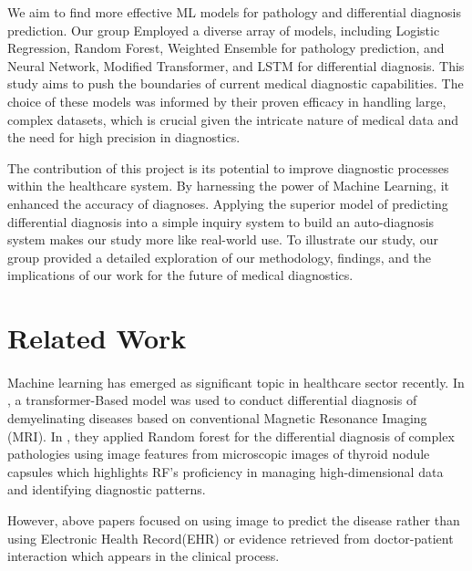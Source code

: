 \documentclass{article}
\begin{document}
We aim to find more effective ML models for pathology and differential diagnosis prediction. Our group Employed a diverse array of models, including Logistic Regression, Random Forest, Weighted Ensemble for pathology prediction, and Neural Network, Modified Transformer, and LSTM for differential diagnosis. This study aims to push the boundaries of current medical diagnostic capabilities. The choice of these models was informed by their proven efficacy in handling large, complex datasets, which is crucial given the intricate nature of medical data and the need for high precision in diagnostics.

The contribution of this project is its potential to improve diagnostic processes within the healthcare system. By harnessing the power of Machine Learning, it enhanced the accuracy of diagnoses. Applying the superior model of predicting differential diagnosis into a simple inquiry system to build an auto-diagnosis system makes our study more like real-world use. To illustrate our study, our group provided a detailed exploration of our methodology, findings, and the implications of our work for the future of medical diagnostics.


\section{Related Work}
\paragraph{ }
Machine learning has emerged as significant topic in healthcare sector recently. In \parencite{Huang_2022}, a transformer-Based model was used to conduct differential diagnosis of demyelinating diseases based on conventional Magnetic Resonance Imaging (MRI). In \parencite{Eftimie_2022}, they applied Random forest for the differential diagnosis of complex pathologies using image features from microscopic images of thyroid nodule capsules which highlights RF's proficiency in managing high-dimensional data and identifying diagnostic patterns. 

However, above papers focused on using image to predict the disease rather than using Electronic Health Record(EHR) or evidence retrieved from doctor-patient interaction which appears in the clinical process. 
\end{document}
